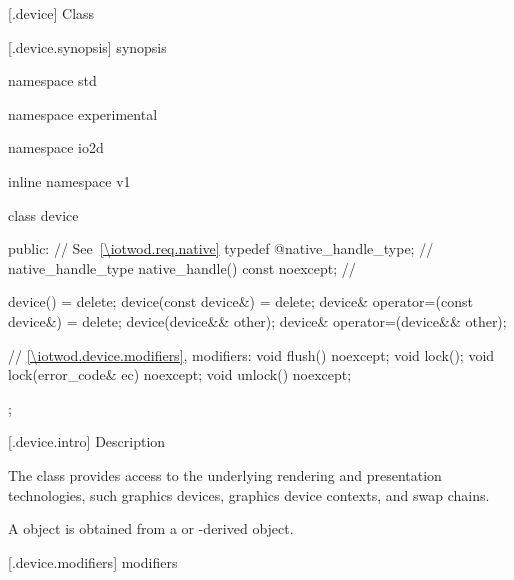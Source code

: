  [\iotwod.device] {Class }

 [\iotwod.device.synopsis] { synopsis}

\begin{codeblock}
namespace std { namespace experimental { namespace io2d { inline namespace v1 {
  class device {
  public:
    // See~\ref{\iotwod.req.native}
    typedef @\impdef@ native_handle_type; //              \expos
    native_handle_type native_handle() const noexcept; // \expos

    device() = delete;
    device(const device&) = delete;
    device& operator=(const device&) = delete;
    device(device&& other);
    device& operator=(device&& other);

    // \ref{\iotwod.device.modifiers}, modifiers:
    void flush() noexcept;
    void lock();
    void lock(error_code& ec) noexcept;
    void unlock() noexcept;
  };
} } } }
\end{codeblock}

 [\iotwod.device.intro] { Description}

\pnum
{}
The  class provides access to the underlying rendering and 
presentation technologies, such graphics devices, graphics device contexts, and swap chains.

\pnum
A  object is obtained from a  or -derived object.

 [\iotwod.device.modifiers] { modifiers}


